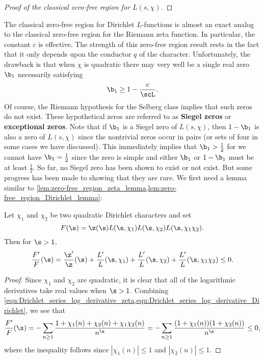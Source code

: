 \begin{proof}[Proof of the classical zero-free region for $L(s,\chi)$]
      \end{proof}

      The classical zero-free region for Dirichlet $L$-functions is almost an exact analog to the classical zero-free region for the Riemann zeta function. In particular, the constant $c$ is effective. The strength of this zero-free region result rests in the fact that it only depends upon the conductor $q$ of the character. Unfortunately, the drawback is that when $\chi$ is quadratic there may very well be a single real zero $\b_{1}$ necessarily satisfying 
      \[
        \b_{1} \ge 1-\frac{c}{\scL}.
      \]
      Of course, the Riemann hypothesis for the Selberg class implies that such zeros do not exist. These hypothetical zeros are referred to as \textbf{Siegel zeros} or \textbf{exceptional zeros}. Note that if $\b_{1}$ is a Siegel zero of $L(s,\chi)$, then $1-\b_{1}$ is also a zero of $L(s,\chi)$ since the nontrivial zeros occur in pairs (or sets of four in some cases we have discussed). This immediately implies that $\b_{1} > \frac{1}{2}$ for we cannot have $\b_{1} = \frac{1}{2}$ since the zero is simple and either $\b_{1}$ or $1-\b_{1}$ must be at least $\frac{1}{2}$. So far, no Siegel zero has been shown to exist or not exist. But some progress has been made to showing that they are rare. We first need a lemma similar to \cref{lem:zero-free_region_zeta_lemma,lem:zero-free_region_Dirichlet_lemma}:

      \begin{lemma}\label{lem:Siegel_zero_rarity_lemma}
        Let $\chi_{1}$ and $\chi_{2}$ be two quadratic Dirichlet characters and set
        \[
          F(\s) = \z(\s)L(\s,\chi_{1})L(\s,\chi_{2})L(\s,\chi_{1}\chi_{2}).
        \]
        Then for $\s > 1$,
        \[
          \frac{F'}{F}(\s) = \frac{\z'}{\z}(\s)+\frac{L'}{L}(\s,\chi_{1})+\frac{L'}{L}(\s,\chi_{2})+\frac{L'}{L}(\s,\chi_{1}\chi_{2}) \le 0. 
        \]
      \end{lemma}
      \begin{proof}
        Since $\chi_{1}$ and $\chi_{2}$ are quadratic, it is clear that all of the logarithmic derivatives take real values when $\s > 1$. Combining \cref{equ:Drichlet_series_log_derivative_zeta,equ:Drichlet_series_log_derivative_Dirichlet}, we see that
        \[
          \frac{F'}{F}(\s) = -\sum_{n \ge 1}\frac{1+\chi_{1}(n)+\chi_{2}(n)+\chi_{1}\chi_{2}(n)}{n^{\s}} = -\sum_{n \ge 1}\frac{(1+\chi_{1}(n))(1+\chi_{2}(n))}{n^{\s}} \le 0,
        \]
        where the inequality follows since $|\chi_{1}(n)| \le 1$ and $|\chi_{2}(n)| \le 1$.
      \end{proof}
      
